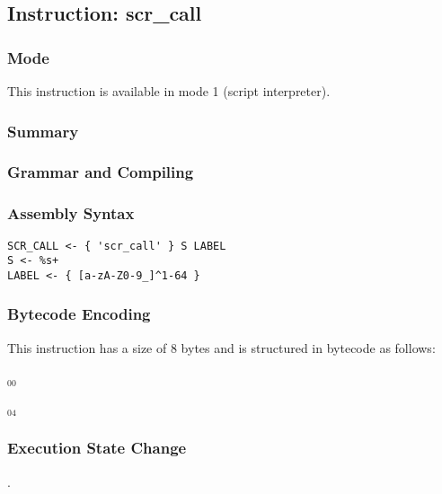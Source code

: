 \subsection{Instruction: scr\_call}

\subsubsection{Mode}
This instruction is available in mode 1 (script interpreter).
\subsubsection{Summary}


\subsubsection{Grammar and Compiling}


\subsubsection{Assembly Syntax}

\begin{myquote}
\begin{verbatim}
SCR_CALL <- { 'scr_call' } S LABEL
S <- %s+
LABEL <- { [a-zA-Z0-9_]^1-64 }
\end{verbatim}
\end{myquote}

\subsubsection{Bytecode Encoding}

This instruction has a size of 8 bytes and is structured in bytecode as follows:

$_{00}$\ 



$_{04}$\ 


\subsubsection{Execution State Change}

.


